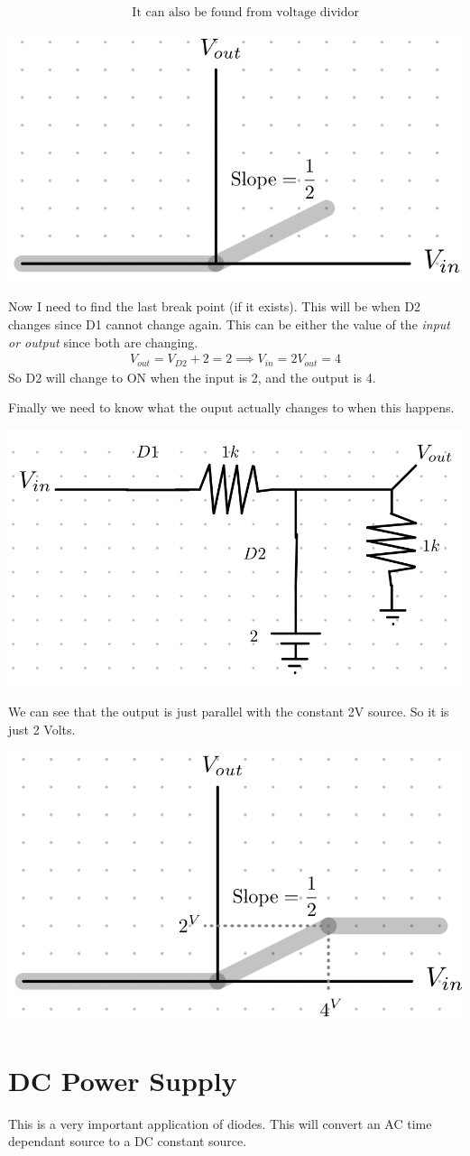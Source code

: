 \documentclass[12pt,letterpaper]{article} \usepackage{amsmath} \usepackage{graphicx} \usepackage[margin=1in]{geometry} \usepackage{longtable}  \usepackage{amssymb}
\begin{document}
\begin{mdframed}[]
\begin{align*}
		&&\text{It can also be found from voltage dividor}
	\end{align*}
	\begin{center}
		\includegraphics[width=0.3\linewidth]{diodes-plotting-1.5}
	\end{center}
	Now I need to find the last break point (if it exists). This will be when D2 changes since D1 cannot change again. This can be either the value of the \textit{input or output} since both are changing. 
	\begin{align*}
		V_{out} = V_{D2} + 2 = 2 \implies V_{in} = 2V_{out} = 4
	\end{align*}
	So D2 will change to ON when the input is 2, and the output is 4. 
	
	Finally we need to know what the ouput actually changes to when this happens.
	\begin{center}
		\includegraphics[width=0.4\linewidth]{diodes-plotting-1.6}
	\end{center}
	We can see that the output is just parallel with the constant 2V source. So it is just 2 Volts. 
	\begin{center}
		\includegraphics[width=0.5\linewidth]{diodes-plotting-1.7}
	\end{center}
	
	
	
	\end{mdframed}
	
	\section{DC Power Supply}
	This is a very important application of diodes. This will convert an AC time dependant source to a DC constant source. 
	
\end{document}
